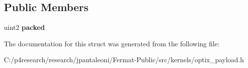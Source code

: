 \subsection*{Public Members}
\begin{DoxyCompactItemize}
\item 
\mbox{\label{struct_shadow_payload_a4f49265e9a8e84156b42a0ffc0f4dbe2}} 
uint2 {\bfseries packed}
\end{DoxyCompactItemize}


The documentation for this struct was generated from the following file\+:\begin{DoxyCompactItemize}
\item 
C\+:/p4research/research/jpantaleoni/\+Fermat-\/\+Public/src/kernels/optix\+\_\+payload.\+h\end{DoxyCompactItemize}
